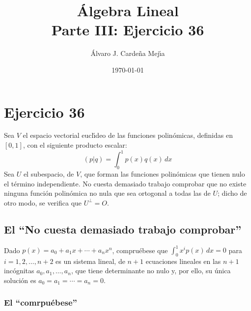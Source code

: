\documentclass[a4paper,11pt]{article}
\title{\'Algebra Lineal\\Parte III: Ejercicio 36}
\author{\'Alvaro J. Carde\~na Mej\'{\i}a}
\date{\today}
\theoremstyle{teoremas}
\theoremstyle{ejemplos}
\theoremstyle{definiciones}
\theoremstyle{lemas}
\begin{document}
\maketitle

\section{Ejercicio 36}

Sea $V$ el espacio vectorial eucl\'{\i}deo de las funciones polin\'omicas, definidas en $[0,1]$, con el siguiente producto escalar:
\begin{equation}
 (p|q) = \int_{0}^{1} p(x)q(x)\, dx
\end{equation}
Sea $U$ el subespacio, de $V$, que forman las funciones polin\'omicas que tienen nulo el t\'ermino independiente.
No cuesta demasiado trabajo comprobar que no existe ninguna funci\'on polin\'omica no nula que sea ortogonal a todas las de $U$; dicho de otro modo, se verifica que $U^{\perp} = O$.

\subsection{El ``No cuesta demasiado trabajo comprobar''}

Dado $p(x) = a_0 + a_1x + \cdots + a_nx^n$, compru\'ebese que $\int_{0}^{1} x^i p(x)\, dx = 0$ para $i = 1, 2, \ldots , n+2$ es un sistema lineal, de $n + 1$ ecuaciones lineales en las $n + 1$ inc\'ognitas $a_0, a_1, \ldots, a_n$, que tiene determinante no nulo y, por ello, su \'unica soluci\'on es $a_0 = a_1 = \cdots = a_n = 0$.

\subsubsection{El ``comrpu\'ebese''}
\end{document}
